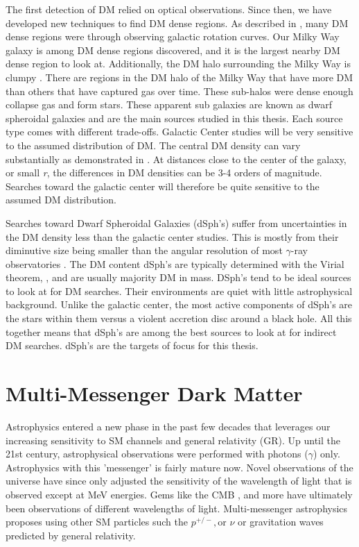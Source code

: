 The first detection of DM relied on optical observations.
Since then, we have developed new techniques to find DM dense regions.
As described in , many DM dense regions were through observing galactic rotation curves.
Our Milky Way galaxy is among DM dense regions discovered, and it is the largest nearby DM dense region to look at.
Additionally, the DM halo surrounding the Milky Way is clumpy \cite{Tracy:les_houches}.
There are regions in the DM halo of the Milky Way that have more DM than others that have captured gas over time.
These sub-halos were dense enough collapse gas and form stars.
These apparent sub galaxies are known as dwarf spheroidal galaxies and are the main sources studied in this thesis.
Each source type comes with different trade-offs.
Galactic Center studies will be very sensitive to the assumed distribution of DM.
The central DM density can vary substantially as demonstrated in .
At distances close to the center of the galaxy, or small \textit{r}, the differences in DM densities can be 3-4 orders of magnitude.
Searches toward the galactic center will therefore be quite sensitive to the assumed DM distribution.

Searches toward Dwarf Spheroidal Galaxies (dSph's) suffer from uncertainties in the DM density less than the galactic center studies.
This is mostly from their diminutive size being smaller than the angular resolution of most $\gamma$-ray observatories \cite{Tracy:les_houches}.
The DM content dSph's are typically determined with the Virial theorem, , and are usually majority DM \cite{Tracy:les_houches} in mass.
DSph's tend to be ideal sources to look at for DM searches.
Their environments are quiet with little astrophysical background.
Unlike the galactic center, the most active components of dSph's are the stars within them versus a violent accretion disc around a black hole.
All this together means that dSph's are among the best sources to look at for indirect DM searches.
dSph's are the targets of focus for this thesis.

\section{Multi-Messenger Dark Matter \label{sec:mult-messengerDM}}

Astrophysics entered a new phase in the past few decades that leverages our increasing sensitivity to SM channels and general relativity (GR).
Up until the 21st century, astrophysical observations were performed with photons ($\gamma$) only.
Astrophysics with this 'messenger' is fairly mature now.
Novel observations of the universe have since only adjusted the sensitivity of the wavelength of light that is observed except at MeV energies.
Gems like the CMB \cite{Plank:CMB}, and more have ultimately been observations of different wavelengths of light.
Multi-messenger astrophysics proposes using other SM particles such the $p^{+/-},\text{or } \nu$ or gravitation waves predicted by general relativity.

